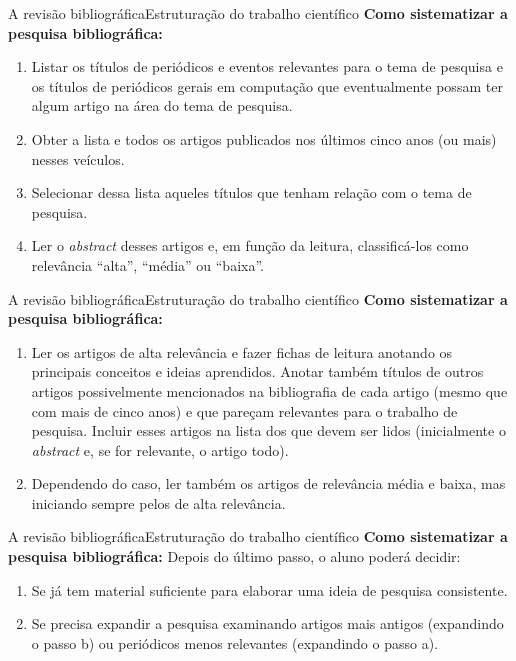 \documentclass[t]{beamer}
\begin{document}
\begin{ftst}{A revisão bibliográfica}{Estruturação do trabalho científico}
\justifying
\textbf{Como sistematizar a pesquisa bibliográfica:}
\vone
\begin{enumerate}
    \item[a.] Listar os títulos de periódicos e eventos relevantes para o tema de pesquisa e os títulos de periódicos gerais em computação que eventualmente possam ter algum artigo na área do tema de pesquisa.
    \item[b.] Obter a lista e todos os artigos publicados nos últimos cinco anos (ou mais) nesses veículos.
    \item[c.] Selecionar dessa lista aqueles títulos que tenham relação com o tema de pesquisa.
    \item[d.] Ler o \textit{abstract} desses artigos e, em função da leitura, classificá-los como relevância “alta”, “média” ou “baixa”.
\end{enumerate}


\end{ftst}


\begin{ftst}{A revisão bibliográfica}{Estruturação do trabalho científico}
\justifying
\textbf{Como sistematizar a pesquisa bibliográfica:}
\vone
\begin{enumerate}
    \item[e.] Ler os artigos de alta relevância e fazer fichas de leitura anotando os principais conceitos e ideias aprendidos. Anotar também títulos de outros artigos possivelmente mencionados na bibliografia de cada artigo (mesmo que com mais de cinco anos) e que pareçam relevantes para o trabalho de pesquisa. Incluir esses artigos na lista dos que devem ser lidos (inicialmente o \textit{abstract} e, se for relevante, o artigo todo).
    \item[f.] Dependendo do caso, ler também os artigos de relevância média e baixa, mas iniciando sempre pelos de alta relevância.
\end{enumerate}


\end{ftst}


\begin{ftst}{A revisão bibliográfica}{Estruturação do trabalho científico}
\justifying
\textbf{Como sistematizar a pesquisa bibliográfica:}
\vone
Depois do último passo, o aluno poderá decidir:
\vone
\begin{enumerate}
    \item[1.] Se já tem material suficiente para elaborar uma ideia de pesquisa consistente.
    \item[2.] Se precisa expandir a pesquisa examinando artigos mais antigos (expandindo o passo b) ou periódicos menos relevantes (expandindo o passo a).

\end{enumerate}


\end{ftst}
\end{document}
